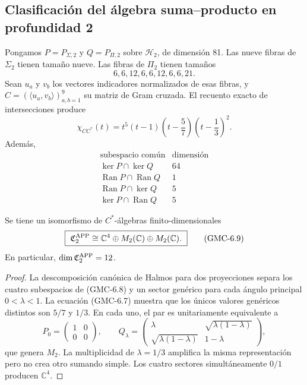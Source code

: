 \subsection{Clasificación del álgebra suma--producto en profundidad 2}

Pongamos $P=P_{\Sigma,2}$ y $Q=P_{\Pi,2}$ sobre $\mathcal H_2$, de dimensión
81. Las nueve fibras de $\Sigma_2$ tienen tamaño nueve. Las fibras de
$\Pi_2$ tienen tamaños
\[
 6,6,12,6,6,12,6,6,21.
 \tag{GMC-6.6}
\]
Sean $u_a$ y $v_b$ los vectores indicadores normalizados de esas fibras, y
$C=(\langle u_a,v_b\rangle)_{a,b=1}^9$ su matriz de Gram cruzada. El recuento
exacto de intersecciones produce
\[
 \chi_{CC^*}(t)
 =t^5(t-1)\left(t-\frac57\right)
       \left(t-\frac13\right)^2.
 \tag{GMC-6.7}
\]
Además,
\[
\begin{array}{c|c}
\text{subespacio común} & \text{dimensión}\\
\hline
\ker P\cap\ker Q&64\\
\operatorname{Ran}P\cap\operatorname{Ran}Q&1\\
\operatorname{Ran}P\cap\ker Q&5\\
\ker P\cap\operatorname{Ran}Q&5
\end{array}
\tag{GMC-6.8}
\]

\begin{theorem}[Álgebra suma--producto de APP en $d=2$]
\label{p12-83-c22-s1:gmc:thm:algebra-app-d2}
Se tiene un isomorfismo de $C^*$-álgebras finito-dimensionales
\[
 \boxed{\ 
 \mathfrak C_2^{\rm APP}
 \cong\mathbb C^4\oplus M_2(\mathbb C)\oplus M_2(\mathbb C).
 \ }
 \tag{GMC-6.9}
\]
En particular, $\dim\mathfrak C_2^{\rm APP}=12$.
\end{theorem}

\begin{proof}
La descomposición canónica de Halmos para dos proyecciones separa los cuatro
subespacios de \textup{(GMC-6.8)} y un sector genérico para cada ángulo principal
$0<\lambda<1$. La ecuación \textup{(GMC-6.7)} muestra que los únicos valores
genéricos distintos son $5/7$ y $1/3$. En cada uno, el par es unitariamente
equivalente a
\[
 P_0=\begin{pmatrix}1&0\\0&0\end{pmatrix},
 \qquad
 Q_\lambda=
 \begin{pmatrix}
  \lambda&\sqrt{\lambda(1-\lambda)}\\
  \sqrt{\lambda(1-\lambda)}&1-\lambda
 \end{pmatrix},
 \tag{GMC-6.10}
\]
que genera $M_2$. La multiplicidad de $\lambda=1/3$ amplifica la misma
representación pero no crea otro sumando simple. Los cuatro sectores
simultáneamente $0/1$ producen $\mathbb C^4$.
\end{proof}

